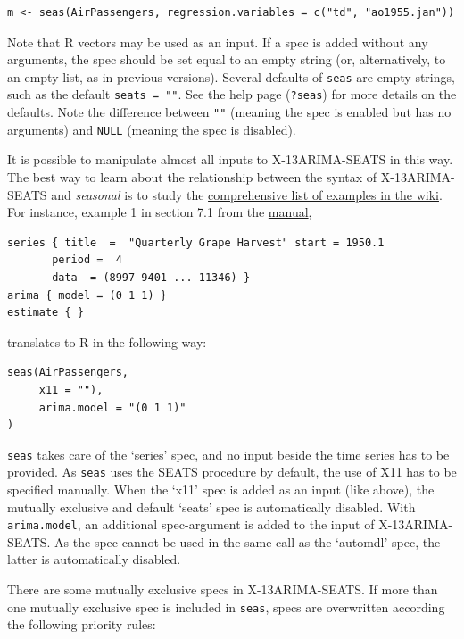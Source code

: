 \begin{verbatim}
m <- seas(AirPassengers, regression.variables = c("td", "ao1955.jan"))
\end{verbatim}

Note that R vectors may be used as an input. If a spec is added without
any arguments, the spec should be set equal to an empty string (or,
alternatively, to an empty list, as in previous versions). Several
defaults of \texttt{seas} are empty strings, such as the default
\texttt{seats = ""}. See the help page (\texttt{?seas}) for more details
on the defaults. Note the difference between \texttt{""} (meaning the
spec is enabled but has no arguments) and \texttt{NULL} (meaning the
spec is disabled).

It is possible to manipulate almost all inputs to X-13ARIMA-SEATS in
this way. The best way to learn about the relationship between the
syntax of X-13ARIMA-SEATS and \emph{seasonal} is to study the
\href{https://github.com/christophsax/seasonal/wiki/Examples-of-X-13ARIMA-SEATS-in-R}{comprehensive
list of examples in the wiki}. For instance, example 1 in section 7.1
from the \href{http://www.census.gov/ts/x13as/docX13ASHTML.pdf}{manual},

\begin{verbatim}
series { title  =  "Quarterly Grape Harvest" start = 1950.1
       period =  4
       data  = (8997 9401 ... 11346) }
arima { model = (0 1 1) }
estimate { }
\end{verbatim}

translates to R in the following way:

\begin{verbatim}
seas(AirPassengers,
     x11 = ""),
     arima.model = "(0 1 1)"
)
\end{verbatim}

\texttt{seas} takes care of the `series' spec, and no input beside the
time series has to be provided. As \texttt{seas} uses the SEATS
procedure by default, the use of X11 has to be specified manually. When
the `x11' spec is added as an input (like above), the mutually exclusive
and default `seats' spec is automatically disabled. With
\texttt{arima.model}, an additional spec-argument is added to the input
of X-13ARIMA-SEATS. As the spec cannot be used in the same call as the
`automdl' spec, the latter is automatically disabled.

There are some mutually exclusive specs in X-13ARIMA-SEATS. If more than
one mutually exclusive spec is included in \texttt{seas}, specs are
overwritten according the following priority rules:

